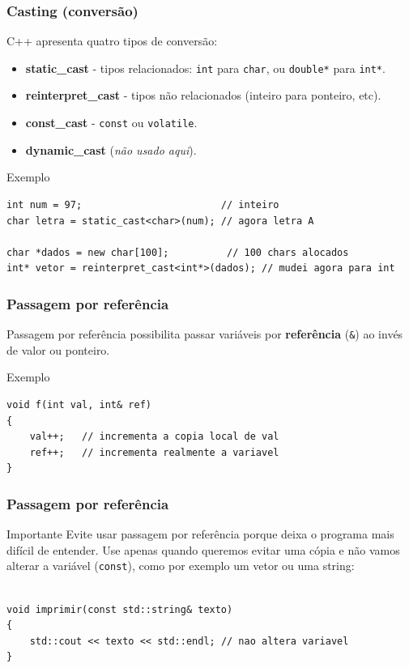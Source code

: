 \documentclass[xcolor={usenames,dvipsnames},10pt,presentation,aspectratio=169]{beamer}
\begin{document}
\begin{frame}[fragile]
  \frametitle{Casting (conversão)}
C++ apresenta quatro tipos de conversão:
\begin{itemize}
\item \textbf{static\_cast} - tipos relacionados: \texttt{int} para \texttt{char},
ou \texttt{double*} para \texttt{int*}.
\item \textbf{reinterpret\_cast} - tipos não relacionados (inteiro para ponteiro, etc).
\item \textbf{const\_cast} - \texttt{const} ou \texttt{volatile}.
\item \textbf{dynamic\_cast} (\emph{não usado aqui}).
\end{itemize}
  \begin{block}{Exemplo}
\begin{lstlisting}
int num = 97;                        // inteiro
char letra = static_cast<char>(num); // agora letra A

char *dados = new char[100];          // 100 chars alocados
int* vetor = reinterpret_cast<int*>(dados); // mudei agora para int
\end{lstlisting}
  \end{block}
\end{frame}
\begin{frame}[fragile]
  \frametitle{Passagem por referência}
Passagem por referência possibilita passar variáveis por 
\textbf{referência} (\verb+&+) ao invés de valor ou ponteiro.
  \begin{block}{Exemplo}
\begin{lstlisting}
void f(int val, int& ref)
{
    val++;   // incrementa a copia local de val
    ref++;   // incrementa realmente a variavel
}
\end{lstlisting}
  \end{block}
%
\end{frame}
\begin{frame}[fragile]
  \frametitle{Passagem por referência}
\begin{alertblock}{Importante}
Evite usar passagem por referência porque deixa o programa
mais difícil de entender.
Use apenas quando queremos evitar uma cópia e não vamos alterar a variável (\verb+const+), 
como por exemplo um vetor ou uma string:
\begin{lstlisting}

void imprimir(const std::string& texto) 
{
    std::cout << texto << std::endl; // nao altera variavel
}
\end{lstlisting}
\end{alertblock}
\end{frame}
\end{document}
